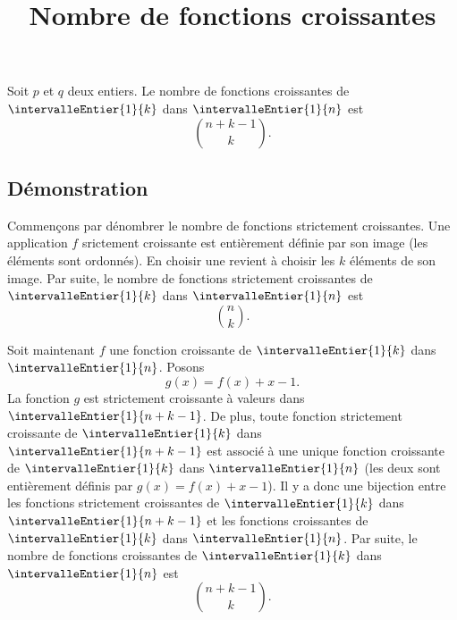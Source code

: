 \documentclass[fontsize=12pt,twoside=false,parskip=half]{scrartcl}
\title{Nombre de fonctions croissantes}
\date{}
\author{}
\begin{document}
\maketitle
   \begin{Theoreme}
      Soit $p$ et $q$ deux entiers. Le nombre de fonctions croissantes de $\intervalleEntier{1}{k}$ dans 
      $\intervalleEntier{1}{n}$ est
      \[
         \binom{n + k - 1}{k}.
      \] 
   \end{Theoreme}
   \subsection{Démonstration}
      Commençons par dénombrer le nombre de fonctions strictement croissantes. Une application $f$ srictement
      croissante est entièrement définie par son image (les éléments sont ordonnés). En choisir une revient à
      choisir les $k$ éléments de son image. 
      Par suite, le nombre de fonctions strictement croissantes de $\intervalleEntier{1}{k}$ dans $\intervalleEntier{1}{n}$ est
      \[
         \binom{n}{k}.
      \]
   
      Soit maintenant $f$ une fonction croissante de $\intervalleEntier{1}{k}$ dans $\intervalleEntier{1}{n}$. Posons
      \[
         g(x) = f(x) + x - 1.
      \]
      La fonction $g$ est strictement croissante à valeurs dans $\intervalleEntier{1}{n + k - 1}$. De plus, toute 
      fonction strictement croissante de $\intervalleEntier{1}{k}$ dans $\intervalleEntier{1}{n + k - 1}$ est associé 
      à une unique fonction croissante de $\intervalleEntier{1}{k}$ dans $\intervalleEntier{1}{n}$ (les deux sont 
      entièrement définis par $g(x) = f(x) + x - 1$). Il y a donc une bijection entre les fonctions strictement 
      croissantes de $\intervalleEntier{1}{k}$ dans $\intervalleEntier{1}{n + k - 1}$ et les fonctions croissantes 
      de $\intervalleEntier{1}{k}$ dans $\intervalleEntier{1}{n}$. Par suite, le nombre de fonctions
      croissantes de $\intervalleEntier{1}{k}$ dans $\intervalleEntier{1}{n}$ est
      \[
         \binom{n + k - 1}{k}.
      \]    
\end{document}

